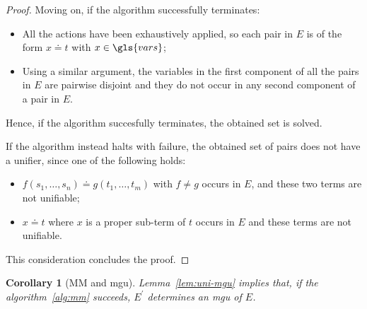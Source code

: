 \documentclass{report}
\theoremstyle{definition}
\theoremstyle{plain}
\newtheorem{cor}{Corollary}[section]
\theoremstyle{remark}
\begin{document}
\begin{proof}
    Moving on, if the algorithm successfully terminates:
    \begin{itemize}
        \item All the actions have been exhaustively applied, so each pair in \(E\) is of the form \(x \doteq t\) with \(x \in \gls{vars}\);
        \item Using a similar argument, the variables in the first component of all the pairs in \(E\) are pairwise disjoint and they do not occur in any second component of a pair in \(E\).
    \end{itemize}
    Hence, if the algorithm succesfully terminates, the obtained set is solved.

    If the algorithm instead halts with failure, the obtained set of pairs does not have a unifier, since one of the following holds:
    \begin{itemize}
        \item \(f(s_1,\dotsc,s_n) \doteq g(t_1,\dotsc,t_m)\) with \(f \ne g\) occurs in \(E\), and these two terms are not unifiable;
        \item \(x \doteq t\) where \(x\) is a proper sub-term of \(t\) occurs in \(E\) and these terms are not unifiable.
    \end{itemize}
    This consideration concludes the proof.
\end{proof}

\begin{cor}[MM and \gls{mgu}]
    Lemma~\ref{lem:uni-mgu} implies that, if the algorithm~\ref{alg:mm} succeeds, \(E^\prime\) determines an \gls{mgu} of \(E\).
\end{cor}

\printglossaries
\end{document}
